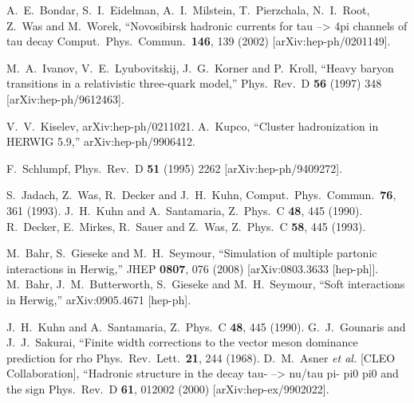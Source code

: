 \documentclass{article}
\begin{document}
\begin{thebibliography}{99}
  A.~E.~Bondar, S.~I.~Eidelman, A.~I.~Milstein, T.~Pierzchala, N.~I.~Root, Z.~Was and M.~Worek,
   ``Novosibirsk hadronic currents for tau --> 4pi channels of tau decay
  Comput.\ Phys.\ Commun.\  {\bf 146}, 139 (2002)
  [arXiv:hep-ph/0201149].

  M.~A.~Ivanov, V.~E.~Lyubovitskij, J.~G.~Korner and P.~Kroll,
  ``Heavy baryon transitions in a relativistic three-quark model,''
  Phys.\ Rev.\  D {\bf 56} (1997) 348
  [arXiv:hep-ph/9612463].

 V.~V.~Kiselev, arXiv:hep-ph/0211021.
  A.~Kupco,
  ``Cluster hadronization in HERWIG 5.9,''
  arXiv:hep-ph/9906412.

F.~Schlumpf,
Phys.\ Rev.\  D {\bf 51} (1995) 2262 [arXiv:hep-ph/9409272].

  S.~Jadach, Z.~Was, R.~Decker and J.~H.~Kuhn,
  Comput.\ Phys.\ Commun.\  {\bf 76}, 361 (1993).
  J.~H.~Kuhn and A.~Santamaria,
  Z.\ Phys.\  C {\bf 48}, 445 (1990).
  R.~Decker, E.~Mirkes, R.~Sauer and Z.~Was,
  Z.\ Phys.\  C {\bf 58}, 445 (1993).

  M.~Bahr, S.~Gieseke and M.~H.~Seymour,
  ``Simulation of multiple partonic interactions in Herwig,''
  JHEP {\bf 0807}, 076 (2008)
  [arXiv:0803.3633 [hep-ph]].
  M.~Bahr, J.~M.~Butterworth, S.~Gieseke and M.~H.~Seymour,
  ``Soft interactions in Herwig,''
  arXiv:0905.4671 [hep-ph].

  J.~H.~Kuhn and A.~Santamaria,
  Z.\ Phys.\  C {\bf 48}, 445 (1990).
  G.~J.~Gounaris and J.~J.~Sakurai,
   ``Finite width corrections to the vector meson dominance prediction for rho
  Phys.\ Rev.\ Lett.\  {\bf 21}, 244 (1968).
  D.~M.~Asner {\it et al.}  [CLEO Collaboration],
   ``Hadronic structure in the decay tau- --> nu/tau pi- pi0 pi0 and the  sign
  Phys.\ Rev.\  D {\bf 61}, 012002 (2000)
  [arXiv:hep-ex/9902022].


\end{thebibliography}
\end{document}
